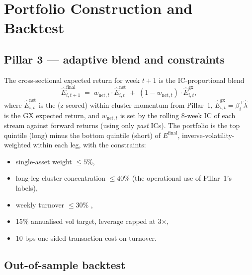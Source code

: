 \documentclass[11pt,a4paper]{article}
\begin{document}
\section{Portfolio Construction and Backtest}\label{sec:portfolio}

\subsection{Pillar 3 --- adaptive blend and constraints}

The cross-sectional expected return for week $t+1$ is the IC-proportional blend
\begin{equation}
\widehat E^\text{final}_{i,t+1} \;=\; w_{\text{net},t}\cdot \widehat E^\text{net}_{i,t} \;+\; (1-w_{\text{net},t})\cdot \widehat E^\text{gx}_{i,t},
\end{equation}
where $\widehat E^\text{net}_{i,t}$ is the (z-scored) within-cluster momentum from Pillar~1, $\widehat E^\text{gx}_{i,t} = \beta_i^\top\hat\lambda$ is the GX expected return, and $w_{\text{net},t}$ is set by the rolling 8-week IC of each stream against forward returns (using only \emph{past} ICs). The portfolio is the top quintile (long) minus the bottom quintile (short) of $E^\text{final}$, inverse-volatility-weighted within each leg, with the constraints:
\begin{itemize}[topsep=2pt,itemsep=0pt]
\item single-asset weight $\le 5\%$,
\item long-leg cluster concentration $\le 40\%$ (the operational use of Pillar~1's labels),
\item weekly turnover $\le 30\%$ \citep{waterfall2024},
\item 15\% annualised vol target, leverage capped at 3$\times$,
\item 10 bps one-sided transaction cost on turnover.
\end{itemize}

\subsection{Out-of-sample backtest}
\end{document}
